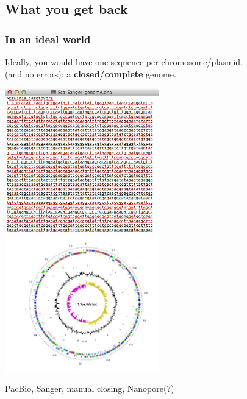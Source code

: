 
\subsection{What you get back}

\begin{frame}
  \frametitle{In an ideal world}
  Ideally, you would have one sequence per chromosome/plasmid.\\
  (and no errors): a \textbf{closed/complete} genome.
  \begin{center}
    \includegraphics[width=0.5\textwidth]{images/pba_sequence}
    \includegraphics[width=0.5\textwidth]{images/complete_genome_circle}
  \end{center}    
  PacBio, Sanger, manual closing, Nanopore(?)
\end{frame}

